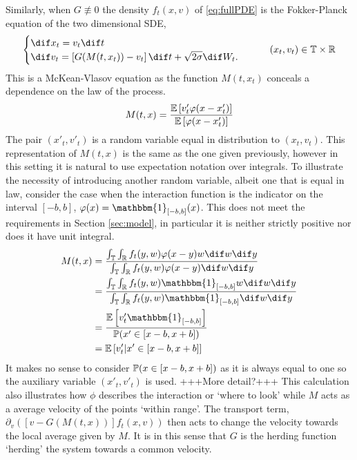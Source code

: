         Similarly, when $G\not\equiv 0$ the density $f_t(x,v)$ of \eqref{eq:fullPDE} is the Fokker-Planck equation of the two dimensional SDE,
		    \begin{equation}\label{eq:McKV}\begin{cases}
		    \dif x_t = v_t\dif t\\
		    \dif v_t = \left[G(M(t,x_t))-v_t\right] \dif t + \sqrt{2\sigma} \dif W_t. 
			\end{cases} \qquad  (x_t,v_t) \in \T \times \R
			\end{equation}
		This is a McKean-Vlasov equation as the function $M(t,x_t)$ conceals a dependence on the law of the process. 
        \[
            M(t,x) = \frac{\E\left[ v'_t \phi(x-x'_t)\right]}{\E\left[\phi(x-x'_t)\right]}
        \]
        The pair $(x'_t,v'_t)$ is a random variable equal in distribution to $(x_t,v_t)$. This representation of $M(t,x)$ is the same as the one given previously, however in this setting it is natural to use expectation notation over integrals. To illustrate the necessity of introducing another random variable, albeit one that is equal in law, consider the case when the interaction function is the indicator on the interval $[-b,b]$, $\phi(x) = \mathbbm{1}_{[-b,b]}(x)$. This does not meet the requirements in Section \ref{sec:model}, in particular it is neither strictly positive nor does it have unit integral. 
        \begin{align*}
            M(t,x) &=  \frac{\int_{\T}\int_{\R}f_t(y,w)\phi(x-y)w\dif w \dif y}{\int_{\T}\int_{\R}f_t(y,w)\phi(x-y)\dif w \dif y}\\
            &=  \frac{\int_{\T}\int_{\R}f_t(y,w) \mathbbm{1}_{[-b,b]}w\dif w \dif y}{\int_{\T}\int_{\R}f_t(y,w) \mathbbm{1}_{[-b,b]}\dif w \dif y}\\
            &= \frac{\E\left[ v'_t \mathbbm{1}_{[-b,b]}\right]}{\P(x' \in \left[x-b,x+b\right])}\\
            &= \E\left[ v'_t|x' \in [x-b,x+b] \right]
        \end{align*}
        It makes no sense to consider $\P(x \in [x-b,x+b])$ as it is always equal to one so the auxiliary variable $(x'_t,v'_t)$ is used. +++More detail?+++ This calculation also illustrates how $\phi$ describes the interaction or `where to look' while $M$ acts as a average velocity of the points `within range'. The transport term, $\partial_v\left( \left[ v-G(M(t,x))\right]f_t(x,v)\right)$ then acts to change the velocity towards the local average given by $M$. It is in this sense that $G$ is the herding function `herding' the system towards a common velocity.
        
